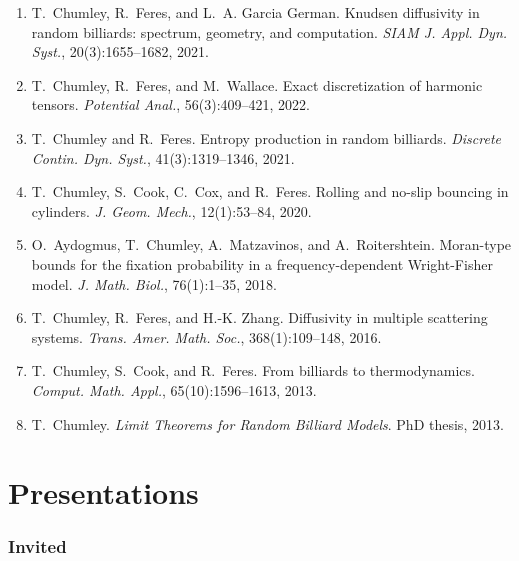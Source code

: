\documentclass[10pt,letterpaper]{article}
\providecommand{\tightlist}{%
  \setlength{\itemsep}{0pt}\setlength{\parskip}{0pt}}
\let\tightlist\relax
\begin{document}
\begin{enumerate}
\def\labelenumi{\arabic{enumi}.}
\tightlist
\item
  \protect\hypertarget{CFG2020}{}{} T.~Chumley, R.~Feres, and L.~A.
  Garcia German. Knudsen diffusivity in random billiards: spectrum,
  geometry, and computation. \emph{SIAM J. Appl. Dyn. Syst.},
  20(3):1655--1682, 2021.
\item
  \protect\hypertarget{CFW2016}{}{} T.~Chumley, R.~Feres, and
  M.~Wallace. Exact discretization of harmonic tensors. \emph{Potential
  Anal.}, 56(3):409--421, 2022.
\item
  \protect\hypertarget{CF2019}{}{} T.~Chumley and R.~Feres. Entropy
  production in random billiards. \emph{Discrete Contin. Dyn. Syst.},
  41(3):1319--1346, 2021.
\item
  \protect\hypertarget{CCCF2018}{}{} T.~Chumley, S.~Cook, C.~Cox, and
  R.~Feres. Rolling and no-slip bouncing in cylinders. \emph{J. Geom.
  Mech.}, 12(1):53--84, 2020.
\item
  \protect\hypertarget{ACMR2016}{}{} O.~Aydogmus, T.~Chumley,
  A.~Matzavinos, and A.~Roitershtein. Moran-type bounds for the fixation
  probability in a frequency-dependent Wright-Fisher model. \emph{J.
  Math. Biol.}, 76(1):1--35, 2018.
\item
  \protect\hypertarget{CFZ2016}{}{} T.~Chumley, R.~Feres, and H.-K.
  Zhang. Diffusivity in multiple scattering systems. \emph{Trans. Amer.
  Math. Soc.}, 368(1):109--148, 2016.
\item
  \protect\hypertarget{CCF2013}{}{} T.~Chumley, S.~Cook, and R.~Feres.
  From billiards to thermodynamics. \emph{Comput. Math. Appl.},
  65(10):1596--1613, 2013.
\item
  \protect\hypertarget{CT}{}{} T.~Chumley. \emph{Limit Theorems for
  Random Billiard Models}. PhD thesis, 2013.
\end{enumerate}

\hypertarget{invited-presentations}{%
\section*{Presentations}\label{invited-presentations}}

\hypertarget{invited}{%
\subsubsection*{Invited}\label{invited}}
\end{document}
